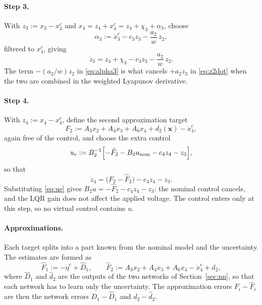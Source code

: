 \paragraph{Step 3.} With $z_3:=x_3-x_3^c$ and $x_4=z_4+x_4^c=z_4+\chi_3+\alpha_3$,
choose
\begin{equation}\label{eq:alpha3}
\alpha_3:=\dot x_3^c-c_3z_3-\frac{a_2}{w}\,z_2 ,
\end{equation}
filtered to $x_4^c$, giving
\begin{equation}\label{eq:z3dot}
\dot z_3=z_4+\chi_3-c_3z_3-\frac{a_2}{w}\,z_2 .
\end{equation}
The term $-(a_2/w)z_2$ in \eqref{eq:alpha3} is what cancels $+a_2z_3$ in
\eqref{eq:z2dot} when the two are combined in the weighted Lyapunov derivative.

\paragraph{Step 4.} With $z_4:=x_4-x_4^c$, define the second approximation target
\begin{equation}\label{eq:F2}
F_2:=A_3x_2+A_4x_3+A_6x_4+d_2(\mathbf{x})-\dot x_4^c ,
\end{equation}
again free of the control, and choose the extra control
\begin{equation}\label{eq:ue}
u_e:=B_2^{-1}\Bigl[-\hat F_2-B_2u_{\mathrm{nom}}-c_4z_4-z_3\Bigr],
\end{equation}
so that
\begin{equation}\label{eq:z4dot}
\dot z_4=\bigl(F_2-\hat F_2\bigr)-c_4z_4-z_3 .
\end{equation}
Substituting \eqref{eq:ue} gives $B_2u=-\hat F_2-c_4z_4-z_3$: the nominal
control cancels, and the LQR gain does not affect the applied voltage. The
control enters only at this step, so no virtual control contains $u$.

\paragraph{Approximations.} Each target splits into a part known from the
nominal model and the uncertainty. The estimates are formed as
\begin{equation}\label{eq:Fhat}
\hat F_1:=-\dot\eta^c+\hat D_1,
\qquad
\hat F_2:=A_3x_2+A_4x_3+A_6x_4-\dot x_4^c+\hat d_2 ,
\end{equation}
where $\hat D_1$ and $\hat d_2$ are the outputs of the two networks of
Section~\ref{sec:nn}, so that each network has to learn only the uncertainty.
The approximation errors $F_i-\hat F_i$ are then the network errors
$D_1-\hat D_1$ and $d_2-\hat d_2$.

